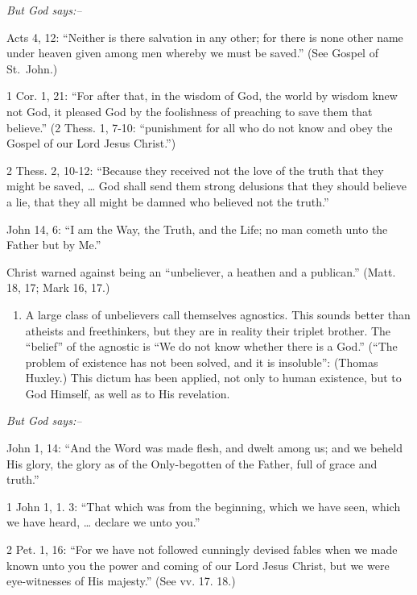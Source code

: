 \documentclass[
]{book}
\providecommand{\tightlist}{%
  \setlength{\itemsep}{0pt}\setlength{\parskip}{0pt}}
\begin{document}
\begin{center}
\textsl{But God says:--}
\end{center}

Acts 4, 12: ``Neither is there salvation in any other; for there is none other name under heaven given among men whereby we must be saved.'' (See Gospel of St.~John.)

1 Cor. 1, 21: ``For after that, in the wisdom of God, the world by wisdom knew not God, it pleased God by the foolishness of preaching to save them that believe.'' (2 Thess. 1, 7-10: ``punishment for all who do not know and obey the Gospel of our Lord Jesus Christ.'')

2 Thess. 2, 10-12: ``Because they received not the love of the truth that they might be saved, \ldots{} God shall send them strong delusions that they should believe a lie, that they all might be damned who believed not the truth.''

John 14, 6: ``I am the Way, the Truth, and the Life; no man cometh unto the Father but by Me.''

Christ warned against being an ``unbeliever, a heathen and a publican.'' (Matt. 18, 17; Mark 16, 17.)

\begin{enumerate}
\def\labelenumi{\arabic{enumi}.}
\setcounter{enumi}{1}
\tightlist
\item
  A large class of unbelievers call themselves agnostics. This sounds better than atheists and freethinkers, but they are in reality their triplet brother. The ``belief'' of the agnostic is ``We do not know whether there is a God.'' (``The problem of existence has not been solved, and it is insoluble'': (Thomas Huxley.) This dictum has been applied, not only to human existence, but to God Himself, as well as to His revelation.
\end{enumerate}

\begin{center}
\textsl{But God says:--}
\end{center}

John 1, 14: ``And the Word was made flesh, and dwelt among us; and we beheld His glory, the glory as of the Only-begotten of the Father, full of grace and truth.''

1 John 1, 1. 3: ``That which was from the beginning, which we have seen, which we have heard, \ldots{} declare we unto you.''

2 Pet. 1, 16: ``For we have not followed cunningly devised fables when we made known unto you the power and coming of our Lord Jesus Christ, but we were eye-witnesses of His majesty.'' (See vv. 17. 18.)
\end{document}
